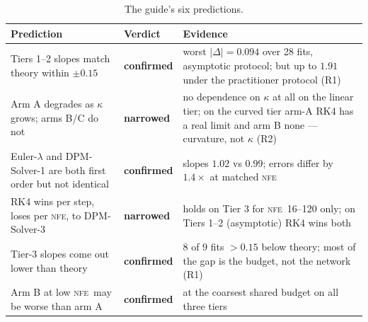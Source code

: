 \documentclass[11pt,a4paper]{article}
\newcommand{\NFE}{\textsc{nfe}}
\newcommand{\lam}{\lambda}
\begin{document}
\begin{table}[!htbp]
\centering
\caption{The guide's six predictions.}
\label{tab:ledger}
\small
\begin{tabular}{@{}p{6.4cm}lp{6.7cm}@{}}
\toprule
Prediction & Verdict & Evidence \\
\midrule
Tiers 1--2 slopes match theory within $\pm0.15$ & \textbf{confirmed} &
worst $|\Delta| = 0.094$ over 28 fits, asymptotic protocol; but up to $1.91$
under the practitioner protocol (R1) \\[3pt]
Arm A degrades as $\kappa$ grows; arms B/C do not & \textbf{narrowed} &
no dependence on $\kappa$ at all on the linear tier; on the curved tier arm-A RK4
has a real limit and arm B none --- curvature, not $\kappa$ (R2) \\[3pt]
Euler-$\lam$ and DPM-Solver-1 are both first order but not identical &
\textbf{confirmed} & slopes $1.02$ vs $0.99$; errors differ by $1.4\times$ at
matched \NFE \\[3pt]
RK4 wins per step, loses per \NFE, to DPM-Solver-3 & \textbf{narrowed} &
holds on Tier 3 for \NFE\ 16--120 only; on Tiers 1--2 (asymptotic) RK4 wins both \\[3pt]
Tier-3 slopes come out lower than theory & \textbf{confirmed} &
8 of 9 fits $>0.15$ below theory; most of the gap is the budget, not the network (R1) \\[3pt]
Arm B at low \NFE\ may be worse than arm A & \textbf{confirmed} &
at the coarsest shared budget on all three tiers \\
\bottomrule
\end{tabular}
\end{table}
\end{document}
